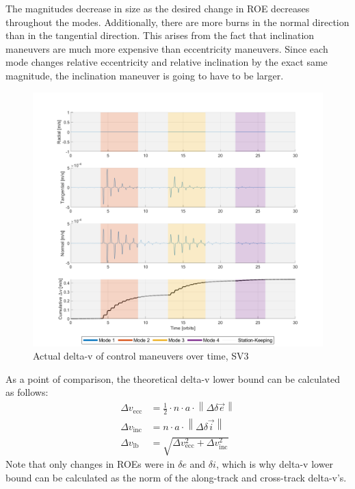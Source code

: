 The magnitudes decrease in size as the desired change in ROE decreases throughout the modes. Additionally, there are more burns in the normal direction than in the tangential direction. This arises from the fact that inclination maneuvers are much more expensive than eccentricity maneuvers. Since each mode changes relative eccentricity and relative inclination by the exact same magnitude, the inclination maneuver is going to have to be larger. 
\begin{figure}[H]
    \centering
    \includegraphics[width=0.75\linewidth]{sim/figures/PS6/delta_v_cumulative_timeline_modes_SV3.png}
    \caption{Actual delta-v of control maneuvers over time, SV3}
    \label{fig:delta_v_modes_cont_SV3}
\end{figure}

As a point of comparison, the theoretical delta-v lower bound can be calculated as follows:
\begin{align*}
\Delta v_{\text{ecc}} &= \frac{1}{2} \cdot n \cdot a \cdot \left\| \Delta \delta\vec{e} \right\| \\
\Delta v_{\text{inc}} &= n \cdot a \cdot \left\| \Delta \delta\vec{i} \right\| \\
\Delta v_{\text{lb}} &= \sqrt{\Delta v_{\text{ecc}}^2 + \Delta v_{\text{inc}}^2}
\end{align*}
Note that only changes in ROEs were in $\delta e$ and $\delta i$, which is why delta-v lower bound can be calculated as the norm of the along-track and cross-track delta-v's. 

